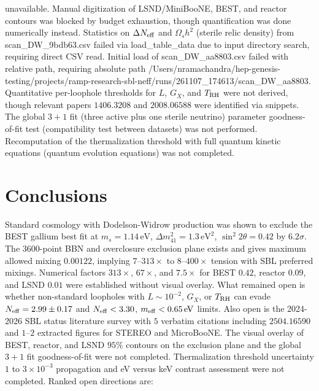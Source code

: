 \documentclass[11pt,a4paper]{article}
\begin{document}
unavailable. Manual digitization of LSND/MiniBooNE, BEST, and reactor contours was blocked by budget exhaustion, though quantification was done numerically instead. Statistics on $\Delta N_{\rm eff}$ and $\Omega_s h^2$ (sterile relic density) from scan\_DW\_9bdb63.csv failed via load\_table\_data due to input directory search, requiring direct CSV read. Initial load of scan\_DW\_aa8803.csv failed with relative path, requiring absolute path /Users/nramachandra/hep-genesis-testing/projects/ramp-research-sbl-neff/runs/261107\_174613/scan\_DW\_aa8803. Quantitative per-loophole thresholds for $L$, $G_X$, and $T_{\rm RH}$ were not derived, though relevant papers $1406.3208$ and $2008.06588$ were identified via snippets. The global $3+1$ fit (three active plus one sterile neutrino) parameter goodness-of-fit test (compatibility test between datasets) was not performed. Recomputation of the thermalization threshold with full quantum kinetic equations (quantum evolution equations) was not completed.

\section{Conclusions}
Standard cosmology with Dodelson-Widrow production was shown to exclude the BEST gallium best fit at $m_s=1.14\,\mathrm{eV}$, $\Delta m^2_{41}=1.3\,\mathrm{eV}^2$, $\sin^2 2\theta=0.42$ by $6.2\sigma$. The $3600$-point BBN and overclosure exclusion plane exists and gives maximum allowed mixing $0.00122$, implying $7$--$313\times$ to $8$--$400\times$ tension with SBL preferred mixings. Numerical factors $313\times$, $67\times$, and $7.5\times$ for BEST $0.42$, reactor $0.09$, and LSND $0.01$ were established without visual overlay. What remained open is whether non-standard loopholes with $L\sim10^{-2}$, $G_X$, or $T_{\rm RH}$ can evade $N_{\rm eff}=2.99\pm0.17$ and $N_{\rm eff}<3.30$, $m_{\rm eff}<0.65\,\mathrm{eV}$ limits. Also open is the 2024-2026 SBL status literature survey with $5$ verbatim citations including $2504.16590$ and $1$--$2$ extracted figures for STEREO and MicroBooNE. The visual overlay of BEST, reactor, and LSND $95\%$ contours on the exclusion plane and the global $3+1$ fit goodness-of-fit were not completed. Thermalization threshold uncertainty $1$ to $3\times10^{-3}$ propagation and eV versus keV contrast assessment were not completed. Ranked open directions are:
\end{document}
